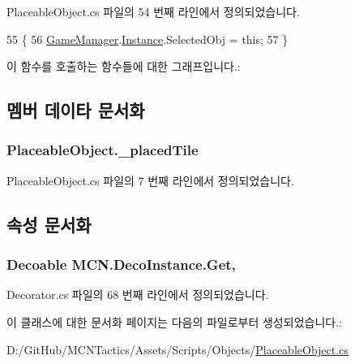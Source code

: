 Placeable\+Object.\+cs 파일의 54 번째 라인에서 정의되었습니다.


\begin{DoxyCode}
55     \{
56         \hyperlink{class_game_manager}{GameManager}.\hyperlink{class_m_c_n_1_1_singletone_a46dbbebd93e96a9592a9803c51f35602}{Instance}.SelectedObj = \textcolor{keyword}{this};
57     \}
\end{DoxyCode}


이 함수를 호출하는 함수들에 대한 그래프입니다.\+:




\subsection{멤버 데이타 문서화}
\subsubsection[{\texorpdfstring{\+\_\+placed\+Tile}{_placedTile}}]{ Placeable\+Object.\+\_\+placed\+Tile\hspace{0.3cm}{\ttfamily [protected]}}\hypertarget{class_placeable_object_a0fd0566f0bb15c71b0630322762342d8}{}\label{class_placeable_object_a0fd0566f0bb15c71b0630322762342d8}


Placeable\+Object.\+cs 파일의 7 번째 라인에서 정의되었습니다.



\subsection{속성 문서화}
\subsubsection[{\texorpdfstring{Get}{Get}}]{\setlength{\rightskip}{0pt plus 5cm}Decoable M\+C\+N.\+Deco\+Instance.\+Get\hspace{0.3cm}{\ttfamily [get]}, {\ttfamily [inherited]}}\hypertarget{class_m_c_n_1_1_deco_instance_af02857ad80446cb4fdd1bf982bda95c5}{}\label{class_m_c_n_1_1_deco_instance_af02857ad80446cb4fdd1bf982bda95c5}


Decorator.\+cs 파일의 68 번째 라인에서 정의되었습니다.



이 클래스에 대한 문서화 페이지는 다음의 파일로부터 생성되었습니다.\+:\begin{DoxyCompactItemize}
\item 
D\+:/\+Git\+Hub/\+M\+C\+N\+Tactics/\+Assets/\+Scripts/\+Objects/\hyperlink{_placeable_object_8cs}{Placeable\+Object.\+cs}\end{DoxyCompactItemize}

